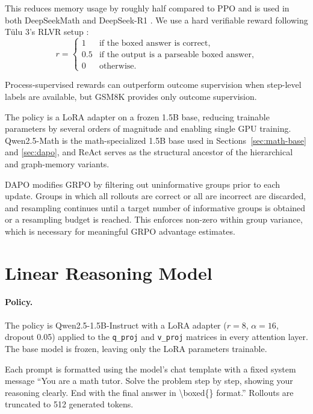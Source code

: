 \documentclass[11pt]{article}
\begin{document}
\newpage
This reduces memory usage by roughly half compared to PPO and is used in both DeepSeekMath \citep{shao2024deepseekmath} and DeepSeek-R1 \citep{deepseekr1}. We use a hard verifiable reward following T\"ulu 3’s RLVR setup \citep{lambert2024tulu3}:
\[
r =
\begin{cases}
1 & \text{if the boxed answer is correct}, \\
0.5 & \text{if the output is a parseable boxed answer}, \\
0 & \text{otherwise}.
\end{cases}
\]

Process-supervised rewards \citep{lightman2023verify} can outperform outcome supervision when step-level labels are available, but GSM8K provides only outcome supervision.

\medskip

The policy is a LoRA adapter \citep{hu2021lora} on a frozen 1.5B base, reducing trainable parameters by several orders of magnitude and enabling single GPU training. Qwen2.5-Math \citep{yang2024qwen25math} is the math-specialized 1.5B base used in Sections~\ref{sec:math-base} and \ref{sec:dapo}, and ReAct \citep{yao2022react} serves as the structural ancestor of the hierarchical and graph-memory variants.

\medskip
DAPO \citep{yu2025dapo} modifies GRPO by filtering out uninformative groups prior to each update. Groups in which all rollouts are correct or all are incorrect are discarded, and resampling continues until a target number of informative groups is obtained or a resampling budget is reached. This enforces non-zero within group variance, which is necessary for meaningful GRPO advantage estimates.

\section{Linear Reasoning Model}
\label{sec:linear}

\paragraph{Policy.}
The policy is Qwen2.5-1.5B-Instruct with a LoRA adapter ($r{=}8$, $\alpha{=}16$, dropout 0.05) applied to the \verb|q_proj| and \verb|v_proj| matrices in every attention layer. The base model is frozen, leaving only the LoRA parameters trainable.

\medskip
Each prompt is formatted using the model’s chat template with a fixed system message ``You are a math tutor. Solve the problem step by step, showing your reasoning clearly. End with the final answer in \textbackslash boxed\{\} format.'' Rollouts are truncated to 512 generated tokens.
\end{document}
